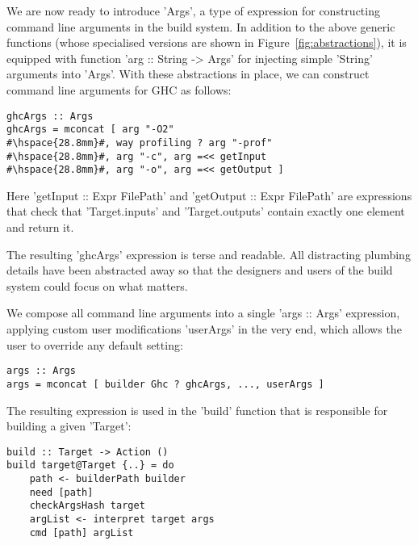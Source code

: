 We are now ready to introduce \lst'Args', a type of expression for
constructing command line arguments in the build system. In addition to the
above generic functions (whose specialised versions are shown in
Figure~\ref{fig:abstractions}), it is equipped with function
\lst'arg :: String -> Args' for injecting simple \lst'String' arguments into
\lst'Args'. With these abstractions in place, we can construct command line
arguments for GHC as follows:

\begin{lstlisting}
ghcArgs :: Args
ghcArgs = mconcat [ arg "-O2"
#\hspace{28.8mm}#, way profiling ? arg "-prof"
#\hspace{28.8mm}#, arg "-c", arg =<< getInput
#\hspace{28.8mm}#, arg "-o", arg =<< getOutput ]
\end{lstlisting}

\noindent Here \lst'getInput :: Expr FilePath' and
\lst'getOutput :: Expr FilePath' are expressions that check that
\lst'Target.inputs' and \lst'Target.outputs' contain exactly one element and
return it.

The resulting \lst'ghcArgs' expression is terse and readable. All
distracting plumbing details have been abstracted away so that the designers and
users of the build system could focus on what matters. 

We compose all command line arguments into a single \lst'args :: Args' expression,
applying custom user modifications \lst'userArgs' in the very end, which
allows the user to override any default setting:

\begin{lstlisting}
args :: Args
args = mconcat [ builder Ghc ? ghcArgs, ..., userArgs ]
\end{lstlisting}

The resulting expression is used in the \lst'build' function that is responsible
for building a given \lst'Target':

\begin{lstlisting}
build :: Target -> Action ()
build target@Target {..} = do
    path <- builderPath builder
    need [path]
    checkArgsHash target
    argList <- interpret target args
    cmd [path] argList
\end{lstlisting}

